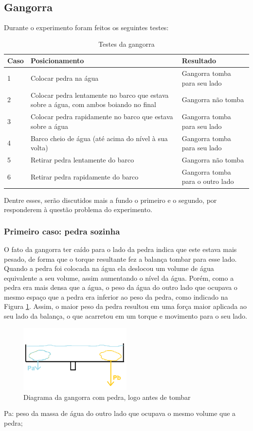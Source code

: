 \subsection{Gangorra}

Durante o experimento foram feitos os seguintes testes:
\begin{table}[H]
    \centering
    \caption{Testes da gangorra}
    \begin{tabular}{|m{2em}|m{15em}|m{13em}|}
    \hline
        Caso & Posicionamento & Resultado \\ \hline
        1 & Colocar pedra na água & Gangorra tomba para seu lado \\ \hline
        2 & Colocar pedra lentamente no barco que estava sobre a água, com ambos boiando no final & Gangorra não tomba \\ \hline
        3 & Colocar pedra rapidamente no barco que estava sobre a água & Gangorra tomba para seu lado \\ \hline
        4 & Barco cheio de água (até acima do nível à sua volta) & Gangorra tomba para seu lado \\ \hline
        5 & Retirar pedra lentamente do barco & Gangorra não tomba \\ \hline
        6 & Retirar pedra rapidamente do barco & Gangorra tomba para o outro lado \\ \hline
    \end{tabular}
    \label{TabGangorra}
\end{table}
Dentre esses, serão discutidos mais a fundo o primeiro e o segundo, por responderem à questão problema do experimento.

\subsubsection{Primeiro caso: pedra sozinha}
O fato da gangorra ter caído para o lado da pedra indica que este estava mais pesado, de forma que o torque resultante fez a balança tombar para esse lado. Quando a pedra foi colocada na água ela deslocou um volume de água equivalente a seu volume, assim aumentando o nível da água. Porém, como a pedra era mais densa que a água, o peso da água do outro lado que ocupava o mesmo espaço que a pedra era inferior ao peso da pedra, como indicado na Figura \ref{figGangorra}. Assim, o maior peso da pedra resultou em uma força maior aplicada ao seu lado da balança, o que acarretou em um torque e movimento para o seu lado.
\begin{figure}[H]
    \centering
    \includegraphics[width=0.5\textwidth]{fig/Gangorra.png}
    \caption{Diagrama da gangorra com pedra, logo antes de tombar}
    \label{figGangorra}
\end{figure}
Pa: peso da massa de água do outro lado que ocupava o mesmo volume que a pedra;

